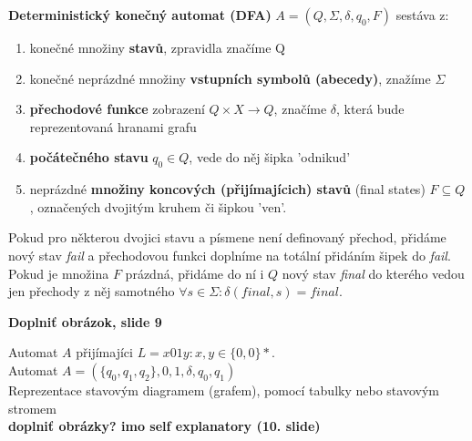 \documentclass[../main.tex]{subfiles}
\begin{document}
\begin{definition}
    \textbf{Deterministický konečný automat (DFA)} $A = (Q, \Sigma,\delta, q_0, F)$ sestáva z:\\
    \begin{enumerate}
    \item  konečné množiny \textbf{stavů}, zpravidla značíme Q\\
    \item konečné neprázdné množiny \textbf{vstupních symbolů (abecedy)}, znažíme $\Sigma$\\
    \item \textbf{přechodové funkce} zobrazení $Q \times X \rightarrow Q$, značíme $\delta$, která bude reprezentovaná hranami grafu\\
    \item \textbf{počátečného stavu} $q_0 \in Q$, vede do něj šipka 'odnikud'\\
    \item neprázdné \textbf{množiny koncových (přijímajícich) stavů} (final states) $F \subseteq Q$, označených dvojitým kruhem či šipkou 'ven'.
    \end{enumerate}
    \begin{remark}
        Pokud pro některou dvojici stavu a písmene není definovaný přechod, přidáme nový stav \textit{fail}
        a přechodovou funkci doplníme na totální přidáním šipek do \textit{fail}.\\

        Pokud je množina $F$ prázdná, přidáme do ní i $Q$ nový stav \textit{final} do kterého vedou jen přechody
        z něj samotného $\forall s \in \Sigma : \delta (final,s) = final$.
    \end{remark} 
    \textbf{Doplniť obrázok, slide 9}
\end{definition}

\begin{example}
    Automat $A$ přijímajíci $L = {x01y : x, y \in \{0,0\}*}$.\\

    Automat $A = (\{q_0,q_1,q_2\}, {0,1}, \delta, q_0, {q_1})$\\
    Reprezentace stavovým diagramem (grafem), pomocí tabulky nebo stavovým stromem
    \\\textbf{doplniť obrázky? imo self explanatory (10. slide)}
\end{example}
\end{document}
